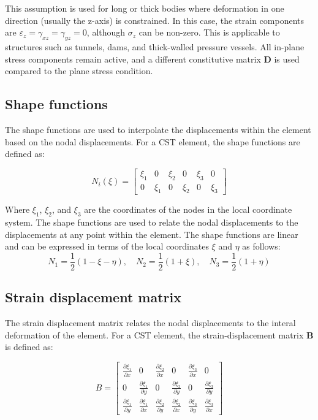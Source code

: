 \documentclass{article}  %
\begin{document}
This assumption is used for long or thick bodies where deformation in one direction (usually the z-axis) is constrained. In this case, the strain components are $\varepsilon_z = \gamma_{xz} = \gamma_{yz} = 0$, although $\sigma_z$ can be non-zero. This is applicable to structures such as tunnels, dams, and thick-walled pressure vessels. All in-plane stress components remain active, and a different constitutive matrix $\mathbf{D}$ is used compared to the plane stress condition.

\subsection{Shape functions}

The shape functions are used to interpolate the displacements within the element based on the nodal displacements. For a CST element, the shape functions are defined as:

\begin{equation}
  N_i(\xi) = \begin{bmatrix}
  \xi_1 & 0 & \xi_2 & 0 & \xi_3 & 0 \\
  0 & \xi_1 & 0 & \xi_2 & 0 & \xi_3
  \end{bmatrix}
\end{equation}

Where $\xi_1$, $\xi_2$, and $\xi_3$ are the coordinates of the nodes in the local coordinate system. The shape functions are used to relate the nodal displacements to the displacements at any point within the element.
The shape functions are linear and can be expressed in terms of the local coordinates $\xi$ and $\eta$ as follows:
\begin{equation}
  N_1 = \frac{1}{2} (1 - \xi - \eta), \quad N_2 = \frac{1}{2} (1 + \xi), \quad N_3 = \frac{1}{2} (1 + \eta)
\end{equation}

\subsection{Strain displacement matrix}

The strain displacement matrix relates the nodal displacements to the interal deformation of the element. For a CST element, the strain-displacement matrix $\mathbf{B}$ is defined as:

\begin{equation}
  B = \begin{bmatrix}
  \frac{\partial \xi_1}{\partial x} & 0 & \frac{\partial \xi_2}{\partial x} & 0 & \frac{\partial \xi_3}{\partial x} & 0 \\
  0 & \frac{\partial \xi_1}{\partial y} & 0 & \frac{\partial \xi_2}{\partial y} & 0 & \frac{\partial \xi_3}{\partial y} \\
  \frac{\partial \xi_1}{\partial y} & \frac{\partial \xi_1}{\partial x} & \frac{\partial \xi_2}{\partial y} & \frac{\partial \xi_2}{\partial x} & \frac{\partial \xi_3}{\partial y} & \frac{\partial \xi_3}{\partial x}
  \end{bmatrix}
\end{equation}
\end{document}
